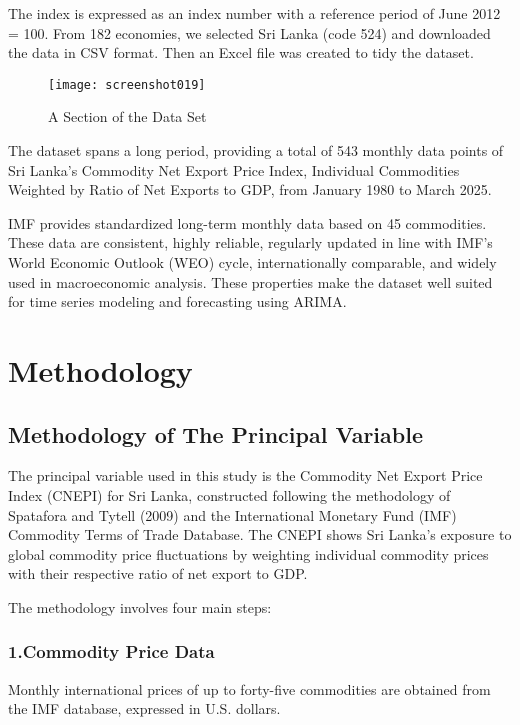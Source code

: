 \documentclass[12pt,a4paper]{report} %
\begin{document}
The index is expressed as an index number with a reference period of June 2012 = 100. From 182 economies, we selected Sri Lanka (code 524) and downloaded the data in CSV format. Then an Excel file was created to tidy the dataset. 

\begin{figure}[h!]
	\centering
	\texttt{[image: screenshot019]}
	\caption{A Section of the Data Set}
	\label{fig:screenshot019}
\end{figure}

The dataset spans a long period, providing a total of 543 monthly data points of Sri Lanka’s Commodity Net Export Price Index, Individual Commodities Weighted by Ratio of Net Exports to GDP, from January 1980 to March 2025.

IMF provides standardized long-term monthly data based on 45 commodities. These data are consistent, highly reliable, regularly updated in line with IMF’s World Economic Outlook (WEO) cycle, internationally comparable, and widely used in macroeconomic analysis. These properties make the dataset well suited for time series modeling and forecasting using ARIMA.

\setcounter{chapter}{3}

\chapter{Methodology}

\section{Methodology of The Principal Variable}
The principal variable used in this study is the Commodity Net Export Price Index (CNEPI) for Sri Lanka, constructed following the methodology of Spatafora and Tytell (2009) and the International Monetary Fund (IMF) Commodity Terms of Trade Database. The CNEPI shows Sri Lanka's exposure to global commodity price fluctuations by weighting individual commodity prices with their respective ratio of net export to GDP.

The methodology involves four main steps:

\subsection*{1.Commodity Price Data}
Monthly international prices of up to forty-five commodities are obtained from the IMF database, expressed in U.S. dollars.
\end{document}
